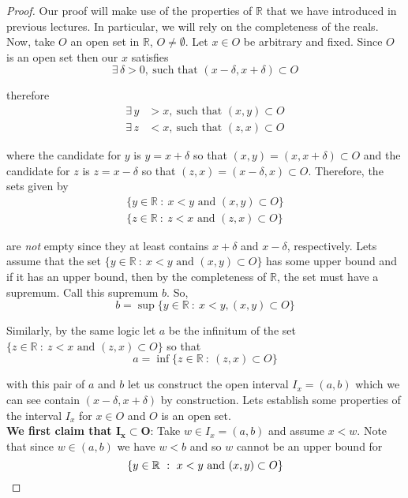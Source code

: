 \documentclass[12pt]{article}
\newcommand{\R}{\mathbb R}
\begin{document}
\begin{proof} Our proof will make use of the properties of $\R$ that we have introduced in previous lectures. In particular, we will rely on the completeness of the reals. Now, take $O$ an open set in $\R$, $O \neq \emptyset$. Let $x \in O$ be arbitrary and fixed. Since $O$ is an open set then our $x$ satisfies
\begin{equation*}
	\exists\,\delta > 0,~\text{such that } (x - \delta, x + \delta) \subset O
\end{equation*}

therefore
\begin{align*}
	\exists\,y &> x,~\text{such that } (x, y) \subset O \\
	\exists\,z &< x,~\text{such that } (z, x) \subset O
\end{align*}

where the candidate for $y$ is $y = x + \delta$ so that $(x, y) = (x, x + \delta) \subset O$ and the candidate for $z$ is $z = x - \delta$ so that $(z, x) = (x - \delta, x) \subset O$. Therefore, the sets given by
\begin{align*}
	\{y \in \R ~:~ x < y \text{ and } (x, y) \subset O\} \\
	\{z \in \R ~:~ z < x \text{ and } (z, x) \subset O\}
\end{align*}

are {\em not} empty since they at least contains $x + \delta$ and $x - \delta$, respectively. Lets assume that the set $\{y \in \R ~:~ x < y \text{ and } (x, y) \subset O\}$ has some upper bound and if it has an upper bound, then by the completeness of $\R$, the set must have a supremum. Call this supremum $b$. So,
\begin{equation*}
	b = \sup \{y\in\R ~:~ x < y, (x,y) \subset O\}
\end{equation*}

Similarly, by the same logic let $a$ be the infinitum of the set $\{z \in \R ~:~ z < x \text{ and } (z, x) \subset O\}$ so that
\begin{equation*}
	a = \inf \{z\in \R~:~ (z, x) \subset O\}
\end{equation*}

with this pair of $a$ and $b$ let us construct the open interval $I_x = (a,b)$ which we can see contain $(x - \delta, x + \delta)$ by construction. Lets establish some properties of the interval $I_x$ for $x \in O$ and $O$ is an open set. \\

{\bf We first claim that $\bm{I_x \subset O}$}: Take $w \in I_x = (a,b)$ and assume $x < w$. Note that since $w \in (a,b)$ we have $w < b$ and so $w$ cannot be an upper bound for
\begin{equation*}
	\{y \in \R ~:~ x < y \text{ and } (x, y) \subset O\} \\
\end{equation*}


\end{proof}
\end{document}
